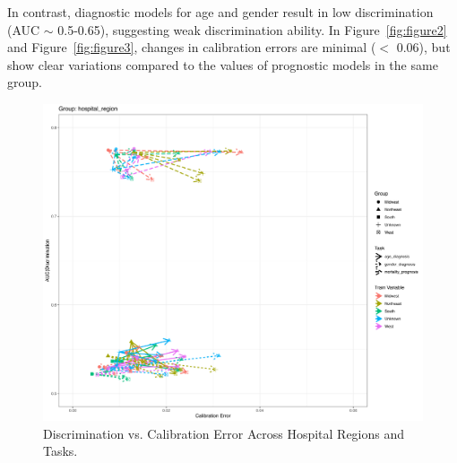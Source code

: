 \documentclass[10.7pt,]{article}
\begin{document}
In contrast, diagnostic models for age and gender result in low discrimination (AUC $\sim$ 0.5-0.65), suggesting weak discrimination ability. In Figure~\ref{fig:figure2} and Figure~\ref{fig:figure3}, changes in calibration errors are minimal ($<$ 0.06), but show clear variations compared to the values of prognostic models in the same group.


\begin{figure}[ht]
\centering
\begin{minipage}{\textwidth}
  \centering
  \includegraphics[height=0.45\textheight]{./figures/figure1.png}  %
  \caption{Discrimination vs. Calibration Error Across Hospital Regions and Tasks.}
  \label{fig:figure1}
\end{minipage}
\end{figure}
\end{document}
